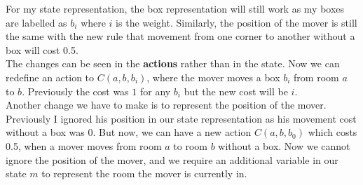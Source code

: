 \begin{enumerate}
\begin{itemize}
        \end{itemize}
        For my state representation, the box representation will still work as my boxes are labelled as $b_i$ where $i$ is the weight. Similarly, the position of the mover is still the same with the new rule that movement from one corner to another without a box will cost 0.5.\\[10pt]
        The changes can be seen in the \textbf{actions} rather than in the state. Now we can redefine an action to $C(a,b,b_i)$, where the mover moves a box $b_i$ from room $a$ to $b$. Previously the cost was $1$ for any $b_i$ but the new cost will be $i$.\\
        Another change we have to make is to represent the position of the mover. Previously I ignored his position in our state representation as his movement cost without a box was 0. But now, we can have a new action $C(a,b,b_0)$ which costs 0.5, when a mover moves from room $a$ to room $b$ without a box. Now we cannot ignore the position of the mover, and we require an additional variable in our state $m$ to represent the room the mover is currently in.
\end{enumerate}